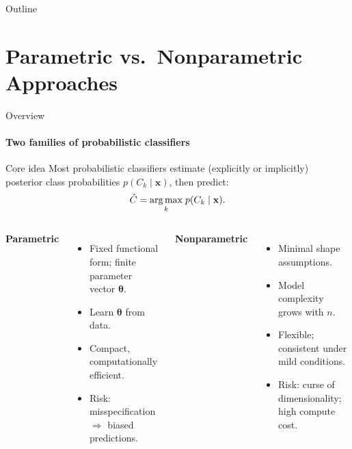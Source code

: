 \begin{frame}{Outline}
  \tableofcontents[hideallsubsections]
\end{frame}

\section{Parametric vs.\ Nonparametric Approaches}

\begin{frame}{Overview}
  \framesubtitle{Two families of probabilistic classifiers}
  \begin{block}{Core idea}
    Most probabilistic classifiers estimate (explicitly or implicitly)\\
    posterior class probabilities $p(C_k\mid\mathbf{x})$, then predict:
    \[
      \hat{C} = \underset{k}{\operatorname{arg\,max}}\; p(C_k\mid\mathbf{x}).
    \]
  \end{block}
  \bigskip
  \begin{columns}[T]
      \textbf{\color{tvrblue}Parametric}
      \begin{itemize}
        \item Fixed functional form; finite parameter vector $\boldsymbol\theta$.
        \item Learn $\boldsymbol\theta$ from data.
        \item Compact, computationally efficient.
        \item Risk: misspecification $\Rightarrow$ biased predictions.
      \end{itemize}
      \textbf{\color{tvrblue}Nonparametric}
      \begin{itemize}
        \item Minimal shape assumptions.
        \item Model complexity grows with $n$.
        \item Flexible; consistent under mild conditions.
        \item Risk: curse of dimensionality; high compute cost.
      \end{itemize}
  \end{columns}
\end{frame}


